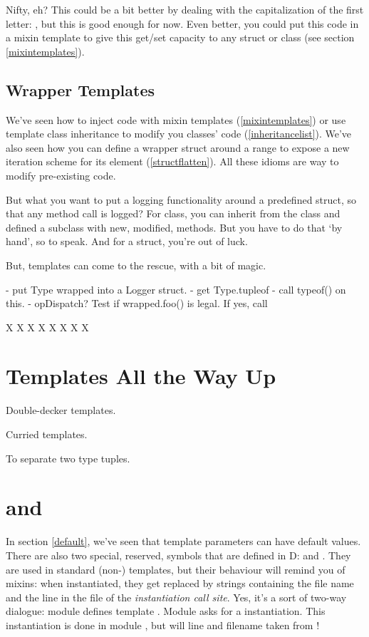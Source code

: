 Nifty, eh? This could be a bit better by dealing with the capitalization of the first letter: , but this is good enough for now. Even better, you could put this code in a mixin template to give this get/set capacity to any struct or class (see section \ref{mixintemplates}).

\subsection{Wrapper Templates}\label{wrappertemplates}

We've seen how to inject code with mixin templates (\ref{mixintemplates}) or use template class inheritance to modify you classes' code (\ref{inheritancelist}). We've also seen how you can define a wrapper struct around a range to expose a new iteration scheme for its element (\ref{structflatten}). All these idioms are way to modify pre-existing code. 

But what you want to put a logging functionality around a predefined struct, so that any method call is logged? For class, you can inherit from the class and defined a subclass with new, modified, methods. But you have to do that `by hand', so to speak. And for a struct, you're out of luck.

But, templates can come to the rescue, with a bit of  magic.


- put Type wrapped into a Logger struct.
- get Type.tupleof
- call typeof() on this.
- opDispatch? Test if wrapped.foo() is legal. If yes, call

X X X X X X X X

\section{Templates All the Way Up}\label{templatesintemplates}


Double-decker templates.

Curried templates.

To separate two type tuples.

\section{ and }\label{fileandline}

In section \ref{default}, we've seen that template parameters can have default values. There are also two special, reserved, symbols that are defined in D:  and . They are used in standard (non-) templates, but their behaviour will remind you of mixins: when instantiated, they get replaced by strings containing the file name and the line in the file of the \emph{instantiation call site}. Yes, it's a sort of two-way dialogue: module  defines template . Module  asks for a  instantiation. This instantiation is done in module , but will line and filename taken from !

